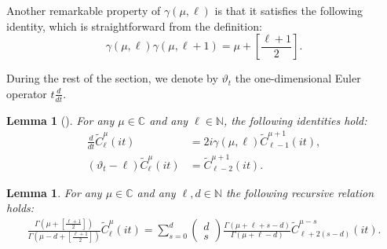 \documentclass[12pt, pdflatex, a4paper]{article}
\theoremstyle{plain}
\newtheorem{lemma}[thm]{Lemma}
\theoremstyle{definition}
\def\C{{\mathbb C}}
\def\Geg{\widetilde{C}}
\def\N{{\mathbb N}}
\begin{document}
Another remarkable property of $\gamma(\mu, \ell)$ is that it satisfies the following identity, which is straightforward from the definition:
\begin{equation}\label{gamma-product-property}
\gamma(\mu, \ell)\gamma(\mu, \ell+1) = \mu + \left[\frac{\ell +1}{2}\right].
\end{equation}

During the rest of the section, we denote by $\vartheta_t$ the one-dimensional Euler operator $t\frac{d}{dt}$.

\begin{lemma}[{\cite[Lem. 14.4]{KKP16}}] For any $\mu \in \C$ and any $\ell \in \N$, the following identities hold:
\begin{align}
\label{derivative-Gegenbauer-1}
\frac{d}{dt}\Geg_\ell^\mu(it) &= 2i\gamma(\mu, \ell)\Geg_{\ell -1}^{\mu + 1}(it),\\[4pt]
\label{derivative-Gegenbauer-2}
\left(\vartheta_t-\ell\right)\widetilde{C}_\ell^\mu(it) &= \Geg_{\ell -2}^{\mu + 1}(it).
\end{align}
\end{lemma}

\begin{lemma}\label{lemma-KKP-identities}
For any $\mu \in \C$ and any $\ell, d \in \N$ the following recursive relation holds:
\begin{align}
\label{TTR-generalized}
\frac{\Gamma\left(\mu+ \left[\frac{\ell+1}{2}\right]\right)}{\Gamma\left(\mu - d + \left[\frac{\ell+1}{2}\right]\right)}
\Geg_\ell^\mu(it) = \sum_{s=0}^{d}
\begin{pmatrix}
d\\
s
\end{pmatrix}
\frac{\Gamma\left(\mu+\ell+s-d\right)}{\Gamma\left(\mu+\ell-d\right)}\Geg_{\ell+2(s-d)}^{\mu-s}(it).
\end{align}
\end{lemma}
\end{document}
